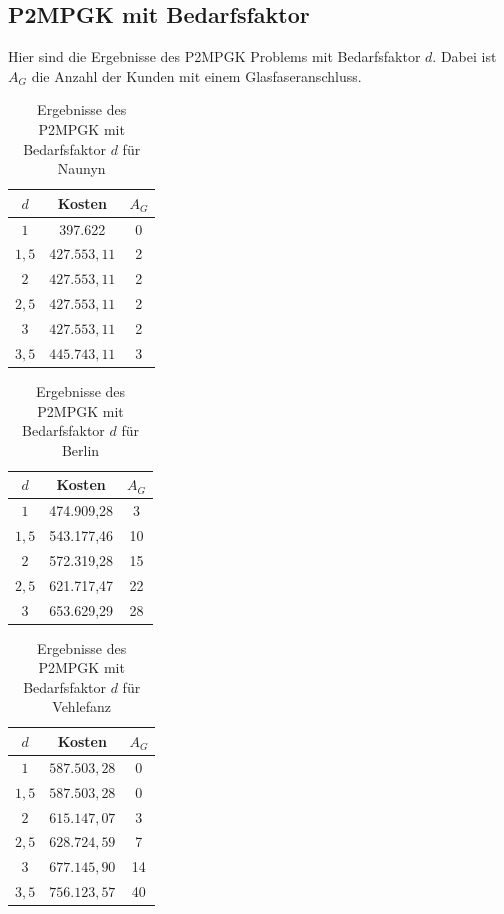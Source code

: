 \documentclass[11pt,a4paper]{article}
\theoremstyle{my_th_style1}
\begin{document}
\vspace{3cm}

\subsection*{P2MPGK mit Bedarfsfaktor}
Hier sind die Ergebnisse des P2MPGK Problems mit Bedarfsfaktor $d$. Dabei ist $A_G$ die Anzahl der Kunden mit einem Glasfaseranschluss.
\begin{table}[!htbp]
	\centering
		\begin{tabular}{c|c|c}
	\centering
	$d$ & Kosten & $A_G$ \\	
	\hline
	$1$   	 &  397.622 & 0  \\
	$1,5$ 	&   $427.553,11$  & 2  \\
	$2$   	&   $427.553,11$ & 2  \\
	$2,5$   	&   $427.553,11$ & 2  \\
	$3$    &   $427.553,11$ & 2  \\
	$3,5$   	&   $445.743,11$ & 3  \\
\end{tabular}
	\caption{Ergebnisse des P2MPGK mit Bedarfsfaktor $d$ f\"ur Naunyn}
	\label{P2MPGKBedarfN} 
\end{table}

\begin{table}[!htbp]
			\centering
			\begin{tabular}{c|c|c}
				\centering
				$d$ & Kosten & $A_G$ \\	
		\hline
	$1$   	 &  474.909,28 & 3  \\
	$1,5$ 	&  543.177,46   & 10  \\
	$2$   	& 572.319,28 & 15  \\
	$2,5$  & 621.717,47  & 22  \\
	$3$    &  653.629,29  & 28  \\
			\end{tabular}
			\caption{Ergebnisse des P2MPGK mit Bedarfsfaktor $d$ f\"ur Berlin} 
			\label{P2MPGKBedarfB}
\end{table}



\begin{table}[!htbp]
	\centering
	\begin{tabular}{c|c|c}
		\centering
		$d$ & Kosten & $A_G$ \\	
		\hline
		$1$   	 &  \(587.503,28\) & 0  \\
		$1,5$ 	&   $587.503,28$  & 0  \\
		$2$   	&   $615.147,07$ & 3 \\
		$2,5$   	&   $628.724,59$ & 7 \\
		$3$    &   $677.145,90$ & 14 \\
		$3,5$   	&   $756.123,57$ & 40 \\
	\end{tabular}
	\caption{Ergebnisse des P2MPGK mit Bedarfsfaktor $d$ f\"ur Vehlefanz} 
	\label{P2MPGKBedarfV}
\end{table}
\end{document}
